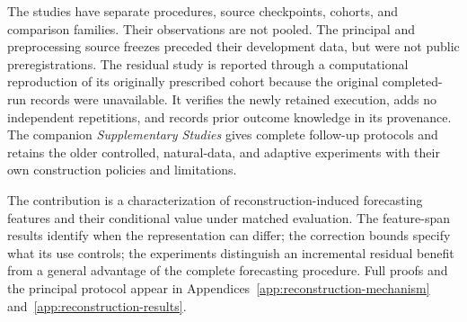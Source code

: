 The studies have separate procedures, source checkpoints, cohorts, and
comparison families. Their observations are not pooled. The principal
and preprocessing source freezes preceded their development data, but
were not public preregistrations. The residual study is reported through
a computational reproduction of its originally prescribed cohort
because the original completed-run records were unavailable. It
verifies the newly retained execution, adds no independent repetitions,
and records prior outcome knowledge in its provenance. The companion
\emph{Supplementary Studies} gives complete follow-up protocols and
retains the older controlled, natural-data, and adaptive experiments
with their own construction policies and limitations.

The contribution is a characterization of reconstruction-induced
forecasting features and their conditional value under matched
evaluation. The feature-span results identify when the representation
can differ; the correction bounds specify what its use controls; the
experiments distinguish an incremental residual benefit from a general
advantage of the complete forecasting procedure. Full proofs and the
principal protocol appear in
Appendices~\ref{app:reconstruction-mechanism}
and~\ref{app:reconstruction-results}.
